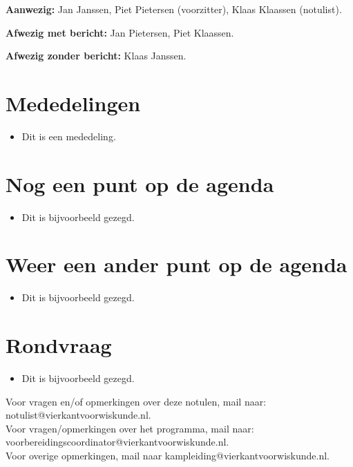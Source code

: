 \documentclass{notulen}
\begin{document}

\textbf{Aanwezig:} Jan Janssen, Piet Pietersen (voorzitter), Klaas Klaassen (notulist).

\textbf{Afwezig met bericht:} Jan Pietersen, Piet Klaassen.

\textbf{Afwezig zonder bericht:} Klaas Janssen.

\section{Mededelingen}
\begin{itemize}
\item Dit is een mededeling.
\end{itemize}

\section{Nog een punt op de agenda}
\begin{itemize}
\item Dit is bijvoorbeeld gezegd.
\end{itemize}

\section{Weer een ander punt op de agenda}
\begin{itemize}
\item Dit is bijvoorbeeld gezegd.
\end{itemize}

\section{Rondvraag}
\begin{itemize}
\item Dit is bijvoorbeeld gezegd.
\end{itemize}

\vfill
\hrulefill

\bigskip Voor vragen en/of opmerkingen over deze notulen, mail naar: notulist@vierkantvoorwiskunde.nl.\\Voor vragen/opmerkingen over het programma, mail
naar: voorbereidingscoordinator@vierkantvoorwiskunde.nl.\\Voor overige opmerkingen, mail naar kampleiding@vierkantvoorwiskunde.nl.
\end{document}
